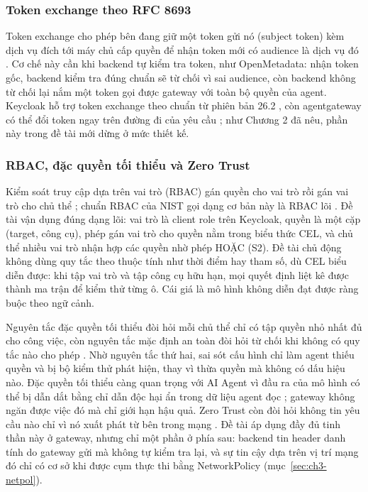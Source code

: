 \subsubsection{Token exchange theo RFC 8693}

Token exchange cho phép bên đang giữ một token gửi nó (subject token) kèm dịch vụ đích tới máy chủ cấp quyền để nhận token mới có audience là dịch vụ đó \parencite{rfc8693}. Cơ chế này cần khi backend tự kiểm tra token, như OpenMetadata: nhận token gốc, backend kiểm tra đúng chuẩn sẽ từ chối vì sai audience, còn backend không từ chối lại nắm một token gọi được gateway với toàn bộ quyền của agent. Keycloak hỗ trợ token exchange theo chuẩn từ phiên bản 26.2 \parencite{keycloak_tokenexchange,graziano2025ste}, còn agentgateway có thể đổi token ngay trên đường đi của yêu cầu \parencite{agw_tokenexchange}; như Chương 2 đã nêu, phần này trong đề tài mới dừng ở mức thiết kế.

\subsubsection{RBAC, đặc quyền tối thiểu và Zero Trust}

Kiểm soát truy cập dựa trên vai trò (RBAC) gán quyền cho vai trò rồi gán vai trò cho chủ thể \parencite{sandhu1996rbac}; chuẩn RBAC của NIST gọi dạng cơ bản này là RBAC lõi \parencite{ferraiolo2001nist}. Đề tài vận dụng đúng dạng lõi: vai trò là client role trên Keycloak, quyền là một cặp (target, công cụ), phép gán vai trò cho quyền nằm trong biểu thức CEL, và chủ thể nhiều vai trò nhận hợp các quyền nhờ phép HOẶC (S2). Đề tài chủ động không dùng quy tắc theo thuộc tính như thời điểm hay tham số, dù CEL biểu diễn được: khi tập vai trò và tập công cụ hữu hạn, mọi quyết định liệt kê được thành ma trận để kiểm thử từng ô. Cái giá là mô hình không diễn đạt được ràng buộc theo ngữ cảnh.

Nguyên tắc đặc quyền tối thiểu đòi hỏi mỗi chủ thể chỉ có tập quyền nhỏ nhất đủ cho công việc, còn nguyên tắc mặc định an toàn đòi hỏi từ chối khi không có quy tắc nào cho phép \parencite{saltzer1975protection}. Nhờ nguyên tắc thứ hai, sai sót cấu hình chỉ làm agent thiếu quyền và bị bộ kiểm thử phát hiện, thay vì thừa quyền mà không có dấu hiệu nào. Đặc quyền tối thiểu càng quan trọng với AI Agent vì đầu ra của mô hình có thể bị dẫn dắt bằng chỉ dẫn độc hại ẩn trong dữ liệu agent đọc \parencite{breakingmcp}; gateway không ngăn được việc đó mà chỉ giới hạn hậu quả. Zero Trust còn đòi hỏi không tin yêu cầu nào chỉ vì nó xuất phát từ bên trong mạng \parencite{nist80207}. Đề tài áp dụng đầy đủ tinh thần này ở gateway, nhưng chỉ một phần ở phía sau: backend tin header danh tính do gateway gửi mà không tự kiểm tra lại, và sự tin cậy dựa trên vị trí mạng đó chỉ có cơ sở khi được cụm thực thi bằng NetworkPolicy (mục~\ref{sec:ch3-netpol}).

